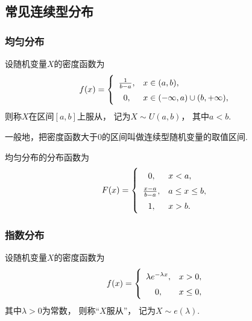 \subsection{常见连续型分布}

\subsubsection{均匀分布}
\begin{definition}
设随机变量\(X\)的密度函数为\begin{equation}\label{equation:连续型分布.均匀分布的密度函数}
	f(x) = \left\{ \def\arraystretch{1.5}
	\begin{array}{cl}
		\frac{1}{b-a}, & x \in (a,b), \\
		0, & x \in (-\infty,a) \cup (b,+\infty), \\
	\end{array} \right.
\end{equation}
则称\(X\)在区间\([a,b]\)上服从，
记为\(X \sim U(a,b)\)，
其中\(a < b\).

一般地，把密度函数大于0的区间叫做连续型随机变量的取值区间.
\end{definition}

\begin{theorem}
均匀分布的分布函数为\begin{equation}
	F(x) = \left\{ \def\arraystretch{1.5}
	\begin{array}{cl}
		0, & x < a, \\
		\frac{x-a}{b-a}, & a \leq x \leq b, \\
		1, & x > b. \\
	\end{array} \right.
\end{equation}
\end{theorem}

\subsubsection{指数分布}
\begin{definition}
设随机变量\(X\)的密度函数为\begin{equation}\label{equation:连续型分布.指数分布的密度函数}
	f(x) = \left\{ \def\arraystretch{1.5} \begin{array}{cl}
		\lambda e^{-\lambda x}, & x > 0, \\
		0, & x \leq 0, \\
	\end{array} \right.
\end{equation}
其中\(\lambda > 0\)为常数，
则称“\(X\)服从”，
记为\(X \sim e(\lambda)\).
\end{definition}

